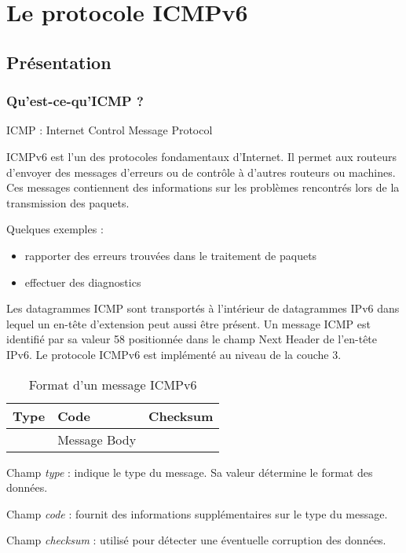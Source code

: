 \chapter{Le protocole ICMPv6}\label{ch:icmpv6}

\section{Présentation}
\subsection{Qu'est-ce-qu'ICMP ?}

ICMP : Internet Control Message Protocol 
\medskip

ICMPv6 est l'un des protocoles fondamentaux d'Internet. Il permet aux routeurs d'envoyer des messages d'erreurs ou de contrôle à d'autres routeurs ou machines. Ces messages contiennent des informations sur les problèmes rencontrés lors de la transmission des paquets.
\medskip
    
Quelques exemples :
    \begin{itemize}
    	\item rapporter des erreurs trouvées dans le traitement de paquets
        \item effectuer des diagnostics
    \end{itemize}
\medskip

Les datagrammes ICMP sont transportés à l'intérieur de datagrammes IPv6 dans lequel un en-tête d'extension peut aussi être présent. Un message ICMP est identifié par sa valeur 58 positionnée dans le champ Next Header de l'en-tête IPv6. Le protocole ICMPv6 est implémenté au niveau de la couche 3.
\medskip

\begin{table}[!h]
  \centering
  \begin{tabular}{|l|l|l|} 
   \hline
   	Type & Code & Checksum \\
    \hline
    & Message Body &\\
    \hline
  \end{tabular}
  \caption{Format d'un message ICMPv6}
\end{table}

Champ \emph{type} : indique le type du message. Sa valeur détermine le format des données.

Champ \emph{code} : fournit des informations supplémentaires sur le type du message.

Champ \emph{checksum} : utilisé pour détecter une éventuelle corruption des données.

